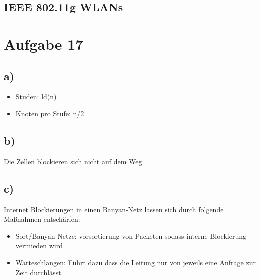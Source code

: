 \documentclass[a4paper,12pt]{scrartcl}
\begin{document}
\subsection{IEEE 802.11g WLANs}

\section{Aufgabe 17}
\subsection{a)}
\begin{itemize}
	\item Studen: ld(n)
	\item Knoten pro Stufe: n/2
\end{itemize}
\subsection{b)}
\begin{center}
\end{center}
Die Zellen blockieren sich nicht auf dem Weg.
\subsection{c)}
Internet Blockierungen in einen Banyan-Netz lassen sich durch folgende Maßnahmen entschärfen:
\begin{itemize}
	\item Sort/Banyan-Netze: vorsortierung von Packeten sodass interne Blockierung vermieden wird
	\item Warteschlangen: Führt dazu dass die Leitung nur von jeweils eine Anfrage zur Zeit durchlässt.
\end{itemize}
\end{document}
